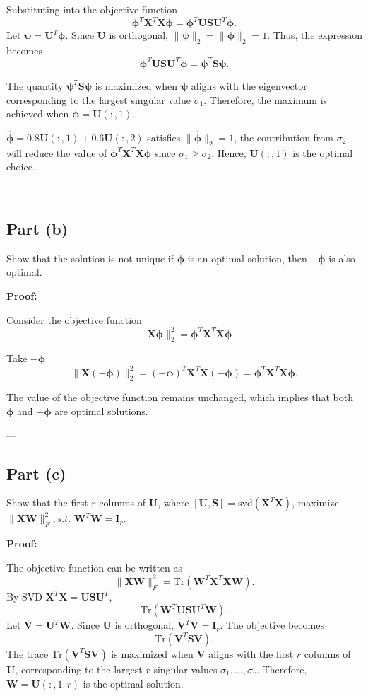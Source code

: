 \documentclass[11pt]{article}
\newcommand{\mtx}[1]{\mathbf{#1}}
\def \mI {\mtx{I}}
\def \mU {\mtx{U}}
\def \mS {\mtx{S}}
\def \mV {\mtx{V}}
\def \mW {\mtx{W}}
\def \mX {\mtx{X}}
\begin{document}
Substituting into the objective function
   \[
   \bm{\phi}^T \mX^T \mX \bm{\phi} = \bm{\phi}^T \mU \mS \mU^T \bm{\phi}.
   \]
   Let $\bm{\psi} = \mU^T \bm{\phi}$. Since $\mU$ is orthogonal, $\|\bm{\psi}\|_2 = \|\bm{\phi}\|_2 = 1$. Thus, the expression becomes
   \[
   \bm{\phi}^T \mU \mS \mU^T \bm{\phi} = \bm{\psi}^T \mS \bm{\psi}.
   \]

The quantity $\bm{\psi}^T \mS \bm{\psi}$ is maximized when $\bm{\psi}$ aligns with the eigenvector corresponding to the largest singular value $\sigma_1$. Therefore, the maximum is achieved when $\bm{\phi} = \mU(:, 1)$.

$\hat{\bm{\phi}} = 0.8 \mU(:, 1) + 0.6 \mU(:, 2)$ satisfies $\|\hat{\bm{\phi}}\|_2 = 1$, the contribution from $\sigma_2$ will reduce the value of $\bm{\phi}^T \mX^T \mX \bm{\phi}$ since $\sigma_1 \geq \sigma_2$. Hence, $\mU(:, 1)$ is the optimal choice.

---

\subsection*{Part (b)}
Show that the solution is not unique if $\bm{\phi}$ is an optimal solution, then $-\bm{\phi}$ is also optimal.

\textbf{Proof:}

Consider the objective function 
	\[
	\|\mX \bm{\phi}\|_2^2 = \bm{\phi}^T \mX^T \mX \bm{\phi}
	\]

Take $-\bm{\phi}$
   \[
   \|\mX (-\bm{\phi})\|_2^2 = (-\bm{\phi})^T \mX^T \mX (-\bm{\phi}) = \bm{\phi}^T \mX^T \mX \bm{\phi}.
   \]

The value of the objective function remains unchanged, which implies that both $\bm{\phi}$ and $-\bm{\phi}$ are optimal solutions.

---

\subsection*{Part (c)}
Show that the first $r$ columns of $\mU$, where $[\mU, \mS] = \text{svd}(\mX^T \mX)$, maximize $\|\mX \bm{\mW}\|_F^2, s.t.$ $\bm{\mW}^T \bm{\mW} = \mI_r$.

\textbf{Proof:}

The objective function can be written as
   \[
   \|\mX \bm{\mW}\|_F^2 = \text{Tr}(\bm{\mW}^T \mX^T \mX \bm{\mW}).
   \]
By SVD $\mX^T \mX = \mU \mS \mU^T$,
   \[
   \text{Tr}(\bm{\mW}^T \mU \mS \mU^T \bm{\mW}).
   \]
Let $\bm{\mV} = \mU^T \bm{\mW}$. Since $\mU$ is orthogonal, $\bm{\mV}^T \bm{\mV} = \mI_r$. The objective becomes
   \[
   \text{Tr}(\bm{\mV}^T \mS \bm{\mV}).
   \]
The trace $\text{Tr}(\bm{\mV}^T \mS \bm{\mV})$ is maximized when $\bm{\mV}$ aligns with the first $r$ columns of $\mU$, corresponding to the largest $r$ singular values $\sigma_1, \dots, \sigma_r$. Therefore, $\bm{\mW} = \mU(:, 1:r)$ is the optimal solution.
\end{document}
